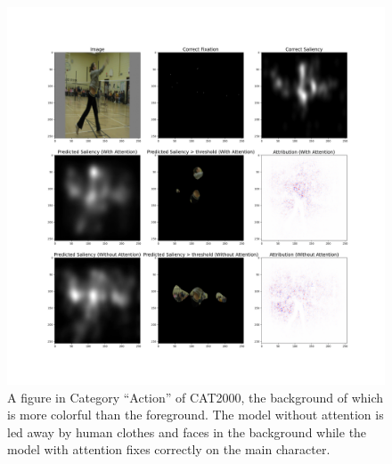 \documentclass[12pt]{article}
\begin{document}
\begin{figure}[h!]
    \centering
    \includegraphics[width=7in]{imgs/used_example_1.png}
    \caption{A figure in Category ``Action'' of CAT2000, the background of which is more colorful than the foreground. The model without attention is led away by human clothes and faces in the background while the model with attention fixes correctly on the main character.}
    \label{img:int_example_1}
\end{figure}
\end{document}
